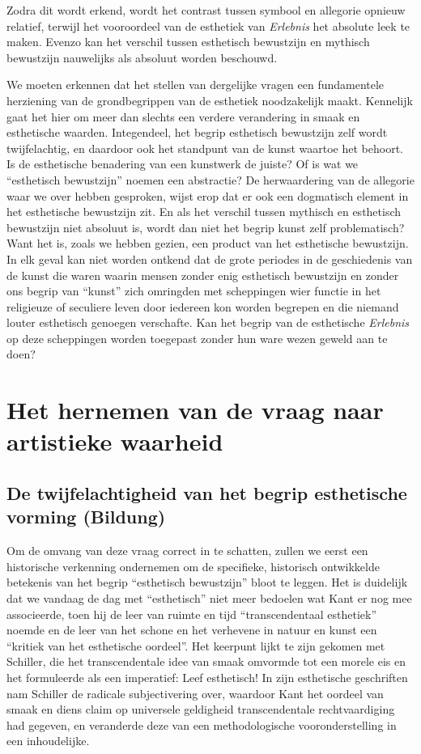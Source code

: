 Zodra dit wordt erkend, wordt het contrast tussen symbool en allegorie opnieuw relatief, terwijl het vooroordeel van de esthetiek van \textit{Erlebnis} het absolute leek te maken. Evenzo kan het verschil tussen esthetisch bewustzijn en mythisch bewustzijn nauwelijks als absoluut worden beschouwd.

We moeten erkennen dat het stellen van dergelijke vragen een fundamentele herziening van de grondbegrippen van de esthetiek noodzakelijk maakt. Kennelijk gaat het hier om meer dan slechts een verdere verandering in smaak en esthetische waarden. Integendeel, het begrip esthetisch bewustzijn zelf wordt twijfelachtig, en daardoor ook het standpunt van de kunst waartoe het behoort. Is de esthetische benadering van een kunstwerk de juiste? Of is wat we ``esthetisch bewustzijn'' noemen een abstractie? De herwaardering van de allegorie waar we over hebben gesproken, wijst erop dat er ook een dogmatisch element in het esthetische bewustzijn zit. En als het verschil tussen mythisch en esthetisch bewustzijn niet absoluut is, wordt dan niet het begrip kunst zelf problematisch? Want het is, zoals we hebben gezien, een product van het esthetische bewustzijn. In elk geval kan niet worden ontkend dat de grote periodes in de geschiedenis van de kunst die waren waarin mensen zonder enig esthetisch bewustzijn en zonder ons begrip van ``kunst'' zich omringden met scheppingen wier functie in het religieuze of seculiere leven door iedereen kon worden begrepen en die niemand louter esthetisch genoegen verschafte. Kan het begrip van de esthetische \textit{Erlebnis} op deze scheppingen worden toegepast zonder hun ware wezen geweld aan te doen?

\section{Het hernemen van de vraag naar artistieke waarheid}

\subsection{De twijfelachtigheid van het begrip esthetische vorming (Bildung)}

Om de omvang van deze vraag correct in te schatten, zullen we eerst een historische verkenning ondernemen om de specifieke, historisch ontwikkelde betekenis van het begrip ``esthetisch bewustzijn'' bloot te leggen. Het is duidelijk dat we vandaag de dag met ``esthetisch'' niet meer bedoelen wat Kant er nog mee associeerde, toen hij de leer van ruimte en tijd ``transcendentaal esthetiek'' noemde en de leer van het schone en het verhevene in natuur en kunst een ``kritiek van het esthetische oordeel''. Het keerpunt lijkt te zijn gekomen met Schiller, die het transcendentale idee van smaak omvormde tot een morele eis en het formuleerde als een imperatief: Leef esthetisch! In zijn esthetische geschriften nam Schiller de radicale subjectivering over, waardoor Kant het oordeel van smaak en diens claim op universele geldigheid transcendentale rechtvaardiging had gegeven, en veranderde deze van een methodologische vooronderstelling in een inhoudelijke.

